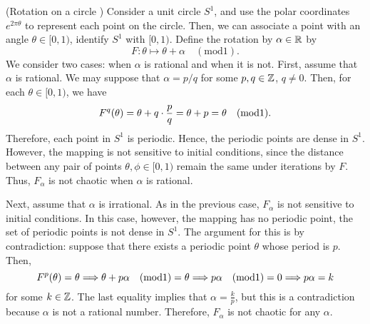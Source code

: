 \documentclass[10pt,draft,twoside]{book}
\begin{document}
\begin{example}
  (Rotation on a circle \citep{devaney})
  Consider a unit circle $S^1$, and use the polar coordinates $e^{2\pi \theta}$ to represent each point on the circle.
  Then, we can associate a point with an angle $\theta \in [0, 1)$, identify $S^1$ with $[0,1)$. %
  Define the rotation by $\alpha \in \mathbb{R}$ by
  \begin{equation*}
    F: \theta \mapsto \theta + \alpha \quad(\mathrm{mod} 1).
  \end{equation*}
  We consider two cases: when $\alpha$ is rational and when it is not.
  First, assume that $\alpha$ is rational.
  We may suppose that $\alpha = p/q$ for some $p, q \in \mathbb{Z}$, $q \neq 0$.
  Then, for each $\theta \in [0, 1)$, we have %
  \begin{equation*}
    F^{q}(\theta) = \theta + q \cdot \frac{p}{q} = \theta + p = \theta \quad(\mathrm{mod} 1).
  \end{equation*}
Therefore, each point in $S^1$ is periodic. %
  Hence, the periodic points are dense in $S^1$. %
  However, the mapping is not sensitive to initial conditions, since the distance between any pair of points $\theta, \phi \in [0,1)$ remain the same under iterations by $F$.  %
  Thus, $F_\alpha$ is not chaotic when $\alpha$ is rational.

  Next, assume that $\alpha$ is irrational.
  As in the previous case, $F_\alpha$ is not sensitive to initial conditions.
In this case, however, the mapping has no periodic point, the set of periodic points is not dense in $S^1$. %
The argument for this is by contradiction: suppose that there exists a periodic point $\theta$ whose period is $p$.
Then,
\begin{equation*}
  F^{p}(\theta) = \theta 
  \Longrightarrow
  \theta + p\alpha \quad(\mathrm{mod} 1) = \theta
  \Longrightarrow
  p\alpha \quad(\mathrm{mod} 1) = 0
  \Longrightarrow
  p\alpha = k
\end{equation*}
for some $k \in \mathbb{Z}$.
The last equality implies that $\alpha = \frac{k}{p}$, but this is a contradiction because $\alpha$ is not a rational number.
Therefore, $F_\alpha$ is not chaotic for any $\alpha$.


\end{example}
\end{document}
